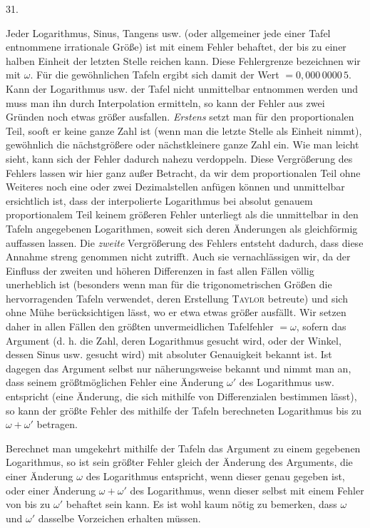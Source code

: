 \par{}
\begin{center}
\hypertarget{native-046-article031}{}31.
\end{center}
Jeder Logarithmus, Sinus, Tangens usw. (oder allgemeiner jede einer Tafel entnommene irrationale Größe) ist mit einem Fehler behaftet, der bis zu einer halben Einheit der letzten Stelle reichen kann. Diese Fehlergrenze bezeichnen wir mit $\omega$. Für die gewöhnlichen Tafeln ergibt sich damit der Wert $=0{,}000\,0000\,5$. Kann der Logarithmus usw. der Tafel nicht unmittelbar entnommen werden und muss man ihn durch Interpolation ermitteln, so kann der Fehler aus zwei Gründen noch etwas größer ausfallen. \emph{Erstens} setzt man für den proportionalen Teil, sooft er keine ganze Zahl ist (wenn man die letzte Stelle als Einheit nimmt), gewöhnlich die nächstgrößere oder nächstkleinere ganze Zahl ein. Wie man leicht sieht, kann sich der Fehler dadurch nahezu verdoppeln. Diese Vergrößerung des Fehlers lassen wir hier ganz außer Betracht, da wir dem proportionalen Teil ohne Weiteres noch eine oder zwei Dezimalstellen anfügen können und unmittelbar ersichtlich ist, dass der interpolierte Logarithmus bei absolut genauem proportionalem Teil keinem größeren Fehler unterliegt als die unmittelbar in den Tafeln angegebenen Logarithmen, soweit sich deren Änderungen als gleichförmig auffassen lassen. Die \emph{zweite} Vergrößerung des Fehlers entsteht dadurch, dass diese Annahme streng genommen nicht zutrifft. Auch sie vernachlässigen wir, da der Einfluss der zweiten und höheren Differenzen in fast allen Fällen völlig unerheblich ist (besonders wenn man für die trigonometrischen Größen die hervorragenden Tafeln verwendet, deren Erstellung \textsc{Taylor} betreute) und sich ohne Mühe berücksichtigen lässt, wo er etwa etwas größer ausfällt. Wir setzen daher in allen Fällen den größten unvermeidlichen Tafelfehler $=\omega$, sofern das Argument (d. h. die Zahl, deren Logarithmus gesucht wird, oder der Winkel, dessen Sinus usw. gesucht wird) mit absoluter Genauigkeit bekannt ist. Ist dagegen das Argument selbst nur näherungsweise bekannt und nimmt man an, dass seinem größtmöglichen Fehler eine Änderung $\omega'$ des Logarithmus usw. entspricht (eine Änderung, die sich mithilfe von Differenzialen bestimmen lässt), so kann der größte Fehler des mithilfe der Tafeln berechneten Logarithmus bis zu $\omega+\omega'$ betragen.

Berechnet man umgekehrt mithilfe der Tafeln das Argument zu einem gegebenen Logarithmus, so ist sein größter Fehler gleich der Änderung des Arguments, die einer Änderung $\omega$ des Logarithmus entspricht, wenn dieser genau gegeben ist, oder einer Änderung $\omega+\omega'$ des Logarithmus, wenn dieser selbst mit einem Fehler von bis zu $\omega'$ behaftet sein kann. Es ist wohl kaum nötig zu bemerken, dass $\omega$ und $\omega'$ dasselbe Vorzeichen erhalten müssen.

